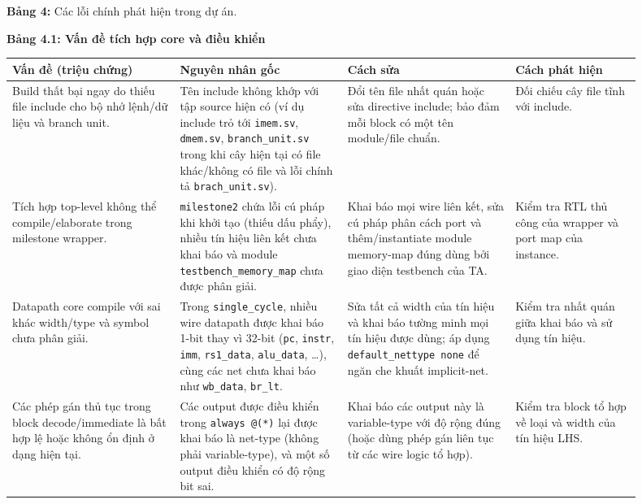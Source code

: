 \documentclass[10pt,a4paper]{article}
\begin{document}
\textbf{Bảng 4:} Các lỗi chính phát hiện trong dự án.

\textbf{Bảng 4.1: Vấn đề tích hợp core và điều khiển}

\begin{center}
\small
\begin{tabular}{@{}p{0.24\linewidth}p{0.24\linewidth}p{0.24\linewidth}p{0.18\linewidth}@{}}
\toprule
\textbf{Vấn đề (triệu chứng)} & \textbf{Nguyên nhân gốc} & \textbf{Cách sửa} & \textbf{Cách phát hiện} \\
\midrule
Build thất bại ngay do thiếu file include cho bộ nhớ lệnh/dữ liệu và branch unit. &
Tên include không khớp với tập source hiện có (ví dụ include trỏ tới \texttt{imem.sv}, \texttt{dmem.sv}, \texttt{branch\_unit.sv} trong khi cây hiện tại có file khác/không có file và lỗi chính tả \texttt{brach\_unit.sv}). &
Đổi tên file nhất quán hoặc sửa directive include; bảo đảm mỗi block có một tên module/file chuẩn. &
Đối chiếu cây file tĩnh với include. \\
\addlinespace
Tích hợp top-level không thể compile/elaborate trong milestone wrapper. &
\texttt{milestone2} chứa lỗi cú pháp khi khởi tạo (thiếu dấu phẩy), nhiều tín hiệu liên kết chưa khai báo và module \texttt{testbench\_memory\_map} chưa được phân giải. &
Khai báo mọi wire liên kết, sửa cú pháp phân cách port và thêm/instantiate module memory-map đúng dùng bởi giao diện testbench của TA. &
Kiểm tra RTL thủ công của wrapper và port map của instance. \\
\addlinespace
Datapath core compile với sai khác width/type và symbol chưa phân giải. &
Trong \texttt{single\_cycle}, nhiều wire datapath được khai báo 1-bit thay vì 32-bit (\texttt{pc}, \texttt{instr}, \texttt{imm}, \texttt{rs1\_data}, \texttt{alu\_data}, \dots), cùng các net chưa khai báo như \texttt{wb\_data}, \texttt{br\_lt}. &
Sửa tất cả width của tín hiệu và khai báo tường minh mọi tín hiệu được dùng; áp dụng \texttt{default\_nettype none} để ngăn che khuất implicit-net. &
Kiểm tra nhất quán giữa khai báo và sử dụng tín hiệu. \\
\addlinespace
Các phép gán thủ tục trong block decode/immediate là bất hợp lệ hoặc không ổn định ở dạng hiện tại. &
Các output được điều khiển trong \texttt{always @(*)} lại được khai báo là net-type (không phải variable-type), và một số output điều khiển có độ rộng bit sai. &
Khai báo các output này là variable-type với độ rộng đúng (hoặc dùng phép gán liên tục từ các wire logic tổ hợp). &
Kiểm tra block tổ hợp về loại và width của tín hiệu LHS. \\

\end{tabular}
\end{center}
\end{document}
